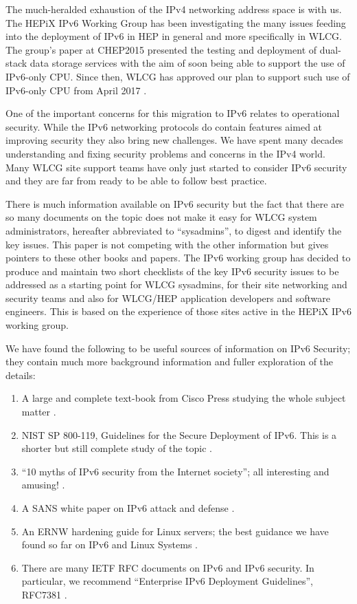 
The much-heralded exhaustion of the IPv4 networking address space is with us. The HEPiX
IPv6 Working Group \cite{ipv6wg} has been investigating the many issues feeding into the deployment of IPv6 in HEP in general and more specifically in WLCG. The group's paper at CHEP2015 \cite{ipv6chep2015} presented the testing and deployment of dual-stack data storage services with the aim of soon being able to support the use of IPv6-only CPU. Since then, WLCG has approved our plan to support such use of IPv6-only CPU from April 2017 \cite{ipv6chep2016}.

One of the important concerns for this migration to IPv6 relates to operational security. While the IPv6 networking protocols do contain features aimed at improving security they also bring new challenges. We have spent many decades understanding and fixing security problems and concerns in the IPv4 world. Many WLCG site support teams have only just started to consider IPv6 security and they are far from ready to be able to follow best practice. 

There is much information available on IPv6 security but the fact that there are so many documents on the topic does not make it easy for WLCG system administrators, hereafter abbreviated to ``sysadmins'', to digest and identify the key issues. This paper is not competing with the other information but gives pointers to these other books and papers. The IPv6 working group has decided to produce and maintain two short checklists of the key IPv6 security issues to be addressed as a starting point for WLCG sysadmins, for their site networking and security teams and also for WLCG/HEP application developers and software engineers. This is based on the experience of those sites active in the HEPiX IPv6 working group.

We have found the following to be useful sources of information on IPv6 Security; they contain much more background information and fuller exploration of the details:

\begin {enumerate}
\item A large and complete text-book from Cisco Press studying the whole subject matter \cite{CiscoBook}.
\item NIST SP 800-119, Guidelines for the Secure Deployment of IPv6. This is a shorter but still complete study of the topic \cite{nist800-119}.
\item ``10 myths of IPv6 security from the Internet society''; all interesting and amusing! \cite{10myths}.
\item A SANS white paper on IPv6 attack and defense \cite {SANSipv6}.
\item An ERNW hardening guide for Linux servers; the best guidance we have found so far on IPv6 and Linux Systems \cite {ERNWipv6}.
\item There are many IETF RFC documents on IPv6 and IPv6 security. In particular, we recommend ``Enterprise IPv6 Deployment Guidelines'', RFC7381 \cite{rfc}.
\end {enumerate}

